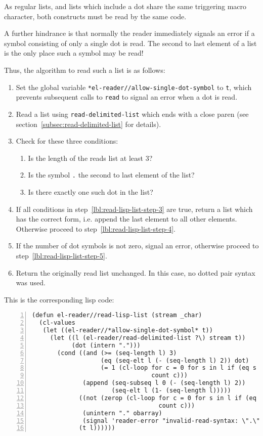 \documentclass[a4paper,10pt,twoside]{report}
\newcommand{\sym}[1]{\texttt{#1}}
\newcommand{\fun}[1]{\texttt{#1}}
\newcommand{\Read}{\fun{read}}
\begin{document}
As regular lists, and lists which include a dot share the same triggering macro
character, both constructs must be read by the same code.

A further hindrance is that normally the reader immediately signals an error if
a symbol consisting of only a single dot is read.  The second to last element of
a list is the only place such a symbol may be read!

Thus, the algorithm to read such a list is as follows:

\begin{enumerate}
\item Set the global variable \sym{*el-reader//allow-single-dot-symbol} to
  \sym{t}, which prevents subsequent calls to \Read{} to signal an error when
  a dot is read.
\item Read a list using \fun{read-delimited-list} which ends with a
  close paren (see section~\ref{subsec:read-delimited-list} for details).
\item \label{lbl:read-lisp-list-step-3}
  Check for these three conditions:
  \begin{enumerate}
  \item Is the length of the reads list at least 3?
  \item Is the symbol \sym{.} the second to last element of the list?
  \item Is there exactly one such dot in the list?
  \end{enumerate}
\item If all conditions in step~\ref{lbl:read-lisp-list-step-3} are true, return
  a list which has the correct form, i.e. append the last element to all other
  elements.  Otherwise proceed to step~\ref{lbl:read-lisp-list-step-4}.
\item \label{lbl:read-lisp-list-step-4}
  If the number of dot symbols is not zero, signal an error, otherwise proceed
  to step~\ref{lbl:read-lisp-list-step-5}.
\item \label{lbl:read-lisp-list-step-5}
  Return the originally read list unchanged.  In this case, no dotted pair
  syntax was used.
\end{enumerate}

This is the corresponding lisp code:
\begin{lstlisting}[style=lispcode,label={code:read-lisp-list},caption={Code for
    \fun{el-reader//read-lisp-list}},numbers=left]
(defun el-reader//read-lisp-list (stream _char)
  (cl-values
   (let ((el-reader//*allow-single-dot-symbol* t))
     (let ((l (el-reader/read-delimited-list ?\) stream t))
           (dot (intern ".")))
       (cond ((and (>= (seq-length l) 3)
                   (eq (seq-elt l (- (seq-length l) 2)) dot)
                   (= 1 (cl-loop for c = 0 for s in l if (eq s dot)
                                 count c)))
              (append (seq-subseq l 0 (- (seq-length l) 2))
                      (seq-elt l (1- (seq-length l)))))
             ((not (zerop (cl-loop for c = 0 for s in l if (eq s dot)
                                   count c)))
              (unintern "." obarray)
              (signal 'reader-error "invalid-read-syntax: \".\""))
             (t l))))))
\end{lstlisting}
\end{document}
